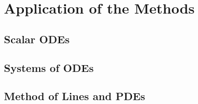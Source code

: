 \chapter{Application of the Methods}
\label{chap:ApplicationOfMethods}

\section{Scalar ODEs}

\section{Systems of ODEs}

\section{Method of Lines and PDEs}
